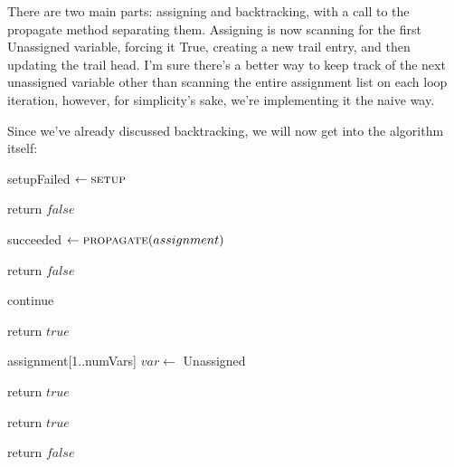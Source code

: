 There are two main parts: assigning and backtracking, with a call to the propagate 
method separating them. Assigning is now scanning for the first Unassigned variable,
forcing it True, creating a new trail entry, and then updating the trail head. I'm 
sure there's a better way to keep track of the next unassigned variable other than 
scanning the entire assignment list on each loop iteration, however, for simplicity's 
sake, we're implementing it the naive way. 

Since we've already discussed backtracking, we will now get into the algorithm 
itself:

\begin{algorithm}[H]
\caption{Modified solving loop}\label{alg:23}
\begin{algorithmic}[1]

\State setupFailed $\gets \Call{setup}{}$

    return $false$
\EndIf

    \State succeeded $\gets \Call{propagate}{assignment}$
        \State {}

            \State return $false$
        \EndIf

        \State continue
    \EndIf

        \State return $true$
    \EndIf

\EndWhile

\EndProcedure
\end{algorithmic}
\end{algorithm}

\begin{algorithm}[H]
\caption{Setup Solve}\label{alg:24}
\begin{algorithmic}[1]

\State assignment[1..numVars]
    \State $var \gets$ Unassigned
\EndFor

    \State return $true$
\EndIf

\State {}

        \State return $true$
    \EndIf
\EndIf

\State return $false$

\EndProcedure
\end{algorithmic}
\end{algorithm}

